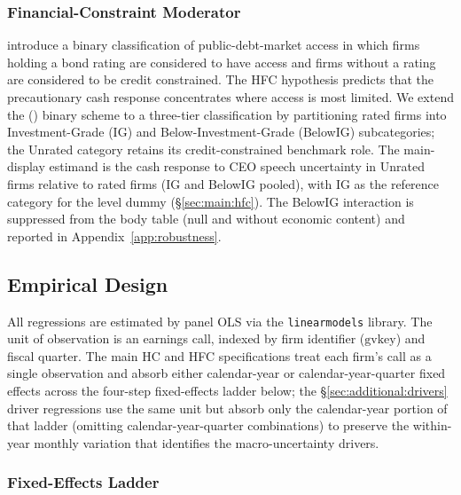 \subsubsection{Financial-Constraint Moderator}

 introduce a binary classification of public-debt-market access in which firms holding a bond rating are considered to have access and firms without a rating are considered to be credit constrained. The HFC hypothesis predicts that the precautionary cash response concentrates where access is most limited. We extend the \citeauthor{faulkender2006} (\citeyear{faulkender2006}) binary scheme to a three-tier classification by partitioning rated firms into Investment-Grade (IG) and Below-Investment-Grade (BelowIG) subcategories; the Unrated category retains its credit-constrained benchmark role. The main-display estimand is the cash response to CEO speech uncertainty in Unrated firms relative to rated firms (IG and BelowIG pooled), with IG as the reference category for the level dummy (\S\ref{sec:main:hfc}). The BelowIG interaction is suppressed from the body table (null and without economic content) and reported in Appendix~\ref{app:robustness}.

\subsection{Empirical Design}
\label{sec:framework:design}

All regressions are estimated by panel OLS via the \texttt{linearmodels} library. The unit of observation is an earnings call, indexed by firm identifier ($\text{gvkey}$) and fiscal quarter. The main HC and HFC specifications treat each firm's call as a single observation and absorb either calendar-year or calendar-year-quarter fixed effects across the four-step fixed-effects ladder below; the \S\ref{sec:additional:drivers} driver regressions use the same unit but absorb only the calendar-year portion of that ladder (omitting calendar-year-quarter combinations) to preserve the within-year monthly variation that identifies the macro-uncertainty drivers.

\subsubsection{Fixed-Effects Ladder}

